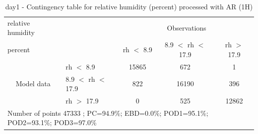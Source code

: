 \begin{table}[p!]
\begin{center}
\begin{tabular}{llccc}
\hline
{relative humidity}                                       &                                                    & \multicolumn{3}{c}{Observations}                 \\
{percent}                                       &                             & rh $<$ 8.9   & 8.9 $<$ rh $<$ 17.9 & rh $>$ 17.9 \\
\hline
\multicolumn{1}{c}{\multirow{3}{*}{Model data}}  & rh $<$ 8.9             & 15865                & 672                       & 1              \\
                                                 & 8.9  $<$ rh $<$ 17.9 & 822                & 16190                       & 396              \\
                                                 & rh $>$ 17.9             & 0                & 525                       & 12862              \\
\hline
\multicolumn{5}{l}{ Number of points        47333 ; PC=94.9\%; EBD=0.0\%; POD1=95.1\%; POD2=93.1\%; POD3=97.0\%}
\end{tabular}
\end{center}
\caption{day1 - Contingency table for  relative humidity (percent) processed with AR (1H)}
\label{tab:contingencyrhAFT:day1}
\end{table}
